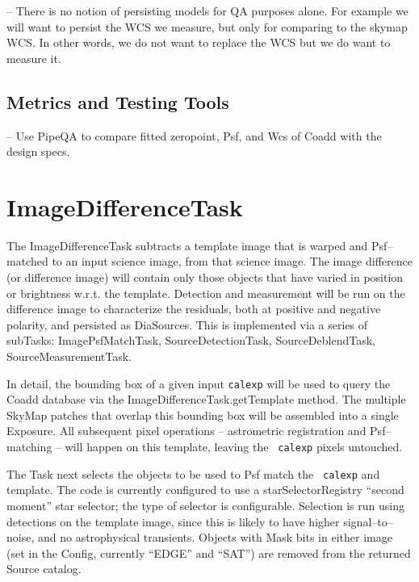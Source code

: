 \documentclass[prd, nofootinbib, floatfix, 11pt,tightenlines,times]{article}
\begin{document}
-- There is no notion of persisting models for QA purposes alone.  For example we will want to persist
the WCS we measure, but only for comparing to the skymap WCS.  In other words, we do not want to replace the 
WCS but we do want to measure it.  

\subsection{Metrics and Testing Tools}

-- Use PipeQA to compare fitted zeropoint, Psf, and Wcs of Coadd with the design specs.


\section{ImageDifferenceTask \label{sec-imagedifftask}} 



The ImageDifferenceTask subtracts a template image that is
warped and Psf--matched to an input science image, from that science image.  The
image difference (or difference image) will contain only those objects
that have varied in position or brightness w.r.t. the template.
Detection and measurement will be run on the difference image to
characterize the residuals, both at positive and negative polarity,
and persisted as DiaSources.  This is implemented via a series of
subTasks: ImagePsfMatchTask, SourceDetectionTask, SourceDeblendTask,
SourceMeasurementTask.

In detail, the bounding box of a given input {\tt calexp} will be used
to query the Coadd database via the ImageDifferenceTask.getTemplate
method.  The multiple SkyMap patches that overlap this bounding box
will be assembled into a single Exposure.  All
subsequent pixel operations -- astrometric registration and
Psf--matching -- will happen on this template, leaving the {\tt
  calexp} pixels untouched.  

The Task next selects the objects to be used to Psf match the {\tt
  calexp} and template.  The code is currently configured to use a
starSelectorRegistry ``second moment'' star selector; the type of selector is configurable.  
Selection is run using detections on the template image,
since this is likely to have higher signal--to--noise, and no
astrophysical transients.  Objects with Mask
bits in either image (set in the Config, currently ``EDGE'' and
``SAT'') are removed from the returned Source catalog.
\end{document}

